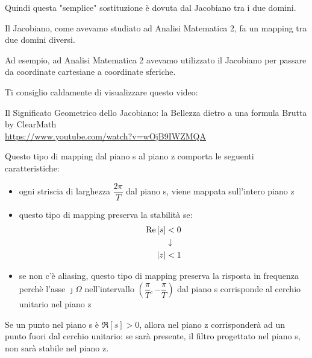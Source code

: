 \newpage 

\begin{tcolorbox}
    Quindi questa "semplice" sostituzione è dovuta dal Jacobiano tra i due domini. \newline 

    Il Jacobiano, come avevamo studiato ad Analisi Matematica 2, fa un mapping tra due domini diversi. \newline 

    Ad esempio, ad Analisi Matematica 2 avevamo utilizzato il Jacobiano per passare da coordinate cartesiane a coordinate sferiche. \newline 

    Ti consiglio caldamente di visualizzare questo video: \newline 

    Il Significato Geometrico dello Jacobiano: la Bellezza dietro a una formula Brutta by ClearMath\\
    \url{https://www.youtube.com/watch?v=wOjB9IWZMQA}
\end{tcolorbox}

Questo tipo di mapping dal piano s al piano z comporta le seguenti caratteristiche: 

\begin{itemize}
    \item ogni striscia di larghezza $\dfrac{2 \pi}{T}$ dal piano s, viene mappata sull'intero piano z 
    \item questo tipo di mapping preserva la stabilità se: 
    {
        \Large 
        \begin{equation}
            \begin{split}
            \Re \left[ s\right] &< 0
            \\
            &\downarrow
            \\
            \abs{z} &< 1    
            \end{split}
        \end{equation}
    }
    \item se non c'è aliasing, questo tipo di mapping preserva la risposta in frequenza perchè l'asse $\jmath \Omega$ nell'intervallo $\left(\dfrac{\pi}{T}, -\dfrac{\pi}{T}\right)$ dal piano s corrisponde al cerchio unitario nel piano z
\end{itemize}

Se un punto nel piano s è $\Re \left[ s\right] > 0$, allora nel piano z corrisponderà ad un punto fuori dal cerchio unitario: 
se sarà presente, il filtro progettato nel piano s, non sarà stabile nel piano z. \newline 

